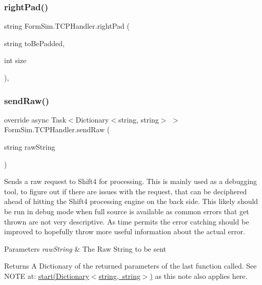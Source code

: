 \subsubsection{\texorpdfstring{right\+Pad()}{rightPad()}}
{\footnotesize\ttfamily string Form\+Sim.\+T\+C\+P\+Handler.\+right\+Pad (\begin{DoxyParamCaption}\item[{string}]{to\+Be\+Padded,  }\item[{int}]{size }\end{DoxyParamCaption})\hspace{0.3cm}{\ttfamily [inline]}, {\ttfamily [private]}}

\mbox{\label{class_form_sim_1_1_t_c_p_handler_a810309bc6e943b6ff12ebed8401613f0}} 
\subsubsection{\texorpdfstring{send\+Raw()}{sendRaw()}}
{\footnotesize\ttfamily override async Task$<$Dictionary$<$string, string$>$ $>$ Form\+Sim.\+T\+C\+P\+Handler.\+send\+Raw (\begin{DoxyParamCaption}\item[{string}]{raw\+String }\end{DoxyParamCaption})\hspace{0.3cm}{\ttfamily [inline]}}



Sends a raw request to Shift4 for processing. This is mainly used as a debugging tool, to figure out if there are issues with the request, that can be deciphered ahead of hitting the Shift4 processing engine on the back side. This likely should be run in debug mode when full source is available as common errors that get thrown are not very descriptive. As time permits the error catching should be improved to hopefully throw more useful information about the actual error. 


\begin{DoxyParams}{Parameters}
{\em raw\+String} & The Raw String to be sent\\
\hline
\end{DoxyParams}
\begin{DoxyReturn}{Returns}
A Dictionary of the returned parameters of the last function called. See N\+O\+TE at\+: \mbox{\hyperlink{interface_form_sim_1_1_f_r_c___handler_a2a2a8a776e774e5f8b5e2b7e623a26a6}{start(\+Dictionary$<$string, string$>$)}} as this note also applies here.
\end{DoxyReturn}


